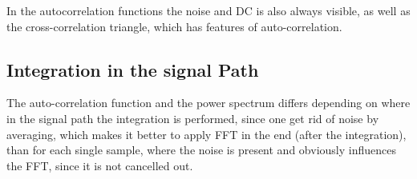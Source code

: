 \documentclass[12pt]{article}
\begin{document}
In the autocorrelation functions the noise and DC is also always visible, as well as the cross-correlation triangle, which has features of auto-correlation.


\subsection{Integration in the signal Path}
The auto-correlation function and the power spectrum differs depending on where in the signal path the integration is performed, since one get rid of noise by averaging, which makes it better to apply FFT in the end (after the integration), than for each single sample, where the noise is present and obviously influences the FFT, since it is not cancelled out.
\end{document}
